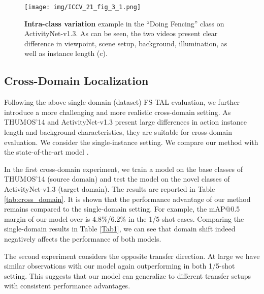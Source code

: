\documentclass{bmvc2k}
\begin{document}
\begin{figure}[h]
\begin{center}
  \texttt{[image: img/ICCV\_21\_fig\_3\_1.png]}
\end{center}
\caption{\textbf{Intra-class variation} example in 
the ``Doing Fencing'' class
on ActivityNet-v1.3. 
As can be seen, the two videos present clear difference
in viewpoint, scene setup, background, illumination,
as well as instance length (c).
}
\label{fig:intra_class}
\end{figure}
\vspace{-0.2in}
\subsection{Cross-Domain Localization} 
Following the above single domain (dataset) FS-TAL evaluation,
we further introduce a more challenging and more realistic cross-domain setting. 
As THUMOS'14 and ActivityNet-v1.3 present large differences in action instance length and background characteristics, they are suitable for cross-domain evaluation.
We consider the single-instance setting.
We compare our method with the state-of-the-art model \cite{yang2020localizing}.






In the first cross-domain experiment, we train a model on the base classes of THUMOS'14 (source domain) and test the model on the novel classes of ActivityNet-v1.3 (target domain). 
The results are reported in Table \ref{tab:cross_domain}.
It is shown that the performance advantage of our method 
remains compared to the single-domain setting.
For example, the mAP@0.5 margin of our model over \cite{yang2020localizing} is 4.8\%/6.2\%
in the 1/5-shot cases.
Comparing the single-domain results in Table \ref{Tab1},
we can see that domain shift indeed negatively affects
the performance of both models.






The second experiment considers the opposite transfer direction. At large we have similar observations with
our model again outperforming \cite{yang2020localizing} in both 1/5-shot setting.
This suggests that our model can generalize to different transfer setups with consistent performance advantages.
\end{document}
